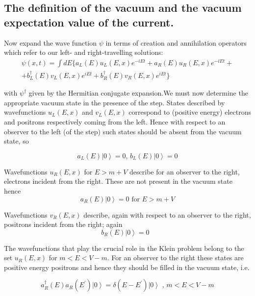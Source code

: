 \subsection{The definition of the vacuum and the vacuum expectation value of
the current.}

Now expand the wave function $\psi $ in terms of creation and annihilation
operators which refer to our left- and right-travelling solutions: 
\begin{equation}
\begin{array}{c}
\psi (x,t)=\int dE\{a_L(E)u_L(E,x)e^{-iEt}+a_R(E)u_R(E,x)e^{-iEt}+ \\ 
+b_L^{\dagger }(E)v_L(E,x)e^{iEt}+b_R^{\dagger }(E)v_R(E,x)e^{iEt}\}
\end{array}
\label{exp}
\end{equation}

\noindent with $\psi ^{\dagger }$ given by the Hermitian conjugate
expansion.We must now determine the appropriate vacuum state in the presence
of the step. States described by wavefunctions $u_L(E,x)$ and $v_L(E,x)$
correspond to (positive energy) electrons and positrons respectively coming
from the left. Hence with respect to an observer to the left (of the step)
such states should be absent from the vacuum state, so

\begin{equation}  \label{a1}
a_L(E)\left| 0\right\rangle =0,\,b_L(E)\left| 0\right\rangle =0
\end{equation}

\noindent Wavefunctions $u_R(E,x)$ for $E>m+V$ describe for an observer to
the right, electrons incident from the right. These are not present in the
vacuum state hence 
\begin{equation}  \label{a2}
a_R(E)\left| 0\right\rangle =0\text{ for }E>m+V
\end{equation}

\noindent Wavefunctions $v_R(E,x)$ describe, again with respect to an
observer to the right, positrons incident from the right; again 
\begin{equation}  \label{b2}
b_R(E)\left| 0\right\rangle =0\text{ }
\end{equation}

\noindent The wavefunctions that play the crucial role in the Klein problem
belong to the set $u_R(E,x)$ for $m<E<V-m.$ For an observer to the right
these states are positive energy positrons and hence they should be filled
in the vacuum state, i.e.

\begin{equation}  \label{vac}
a_R^{\dagger }(E)a_R(E^{\prime })\left| 0\right\rangle =\delta (E-E^{\prime
})\left| 0\right\rangle \text{ , }m<E<V-m
\end{equation}

